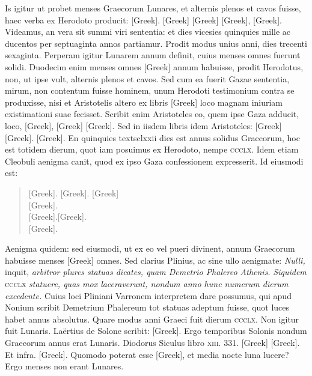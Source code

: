 Is igitur ut probet menses Graecorum
Lunares, et alternis plenos et cavos fuisse, haec verba ex Herodoto
producit: \textgreek{[Greek]}.
\textgreek{[Greek]}
\textgreek{[Greek]}
\textgreek{[Greek]}, \textgreek{[Greek]}.
Videamus, an vera sit summi
viri sententia: et dies vicesies quinquies mille ac ducentos per septuaginta
annos partiamur.
Prodit modus unius anni, dies trecenti sexaginta.
Perperam igitur Lunarem annum definit, cuius menses omnes
fuerunt solidi.
Duodecim enim menses omnes \textgreek{[Greek]}
annum habuisse, prodit Herodotus, non, ut ipse vult, alternis plenos
et cavos.
Sed cum ea fuerit Gazae sententia, mirum, non contentum
fuisse hominem, unum Herodoti testimonium contra se produxisse,
nisi et Aristotelis altero ex libris \textgreek{[Greek]}
 loco magnam iniuriam
existimationi suae fecisset.
Scribit enim Aristoteles eo, quem ipse
Gaza adducit, loco, \textgreek{[Greek]}, \textgreek{[Greek]}
\textgreek{[Greek]}.
Sed in iisdem libris idem Aristoteles: \textgreek{[Greek]}
\textgreek{[Greek]}. \textgreek{[Greek]}.
En quinquies
textsc{lxxii} dies est annus solidus Graecorum, hoc est totidem dierum,
quot iam posuimus ex Herodoto, nempe \textsc{ccclx}.
Idem etiam Cleobuli
aenigma canit, quod ex ipso Gaza confessionem expresserit.
Id eiusmodi
est:
\begin{quote}
\textgreek{[Greek]}. \textgreek{[Greek]}. \textgreek{[Greek]}\\
\textgreek{[Greek]}.\\
\textgreek{[Greek]}.\textgreek{[Greek]}.\\
\textgreek{[Greek]}.
\end{quote}

Aenigma quidem: sed eiusmodi, ut ex eo vel pueri divinent, annum
Graecorum habuisse menses \textgreek{[Greek]} omnes.
Sed clarius Plinius,
ac sine ullo aenigmate: \emph{Nulli,} inquit,
 \emph{arbitror plures statuas dicates,
quam Demetrio Phalereo Athenis.}
\emph{Siquidem} \textsc{ccclx} \emph{statuere,
quas mox laceraverunt, nondum anno hunc numerum dierum excedente.}
Cuius loci Pliniani Varronem interpretem dare possumus,
qui apud Nonium scribit Demetrium Phalereum tot statuas adeptum
fuisse, quot luces habet annus absolutus.
Quare modus anni Graeci
fuit dierum \textsc{ccclx}.
Non igitur fuit Lunaris.
Laërtius de Solone
scribit: \textgreek{[Greek]}.
Ergo temporibus
Solonis nondum Graecorum annus erat Lunaris.
Diodorus Siculus
libro \textsc{xiii}. 331. \textgreek{[Greek]}
\textgreek{[Greek]}.
Et infra. \textgreek{[Greek]}.
Quomodo poterat esse \textgreek{[Greek]}, et media nocte luna lucere?
Ergo menses
non erant Lunares.

